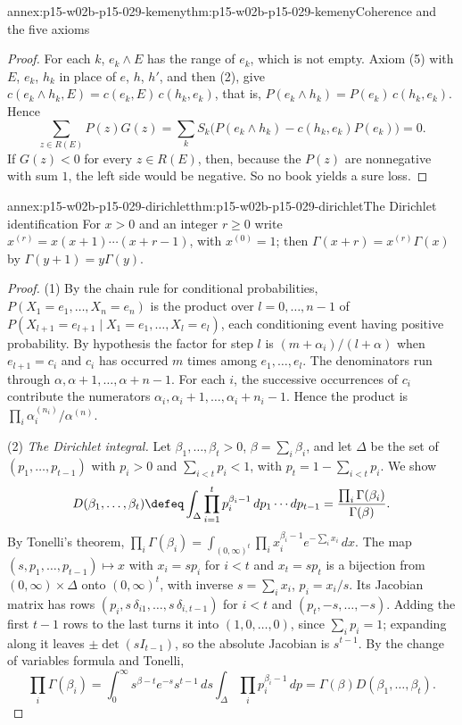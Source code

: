 \begin{annexitem}{annex:p15-w02b-p15-029-kemeny}{thm:p15-w02b-p15-029-kemeny}{Coherence and the five axioms}
\begin{proof}
For each \(k\), \(e_k\land E\) has the range of \(e_k\), which is not
empty. Axiom (5) with \(E\), \(e_k\), \(h_k\) in place of \(e\),
\(h\), \(h'\), and then (2), give
\(c(e_k\land h_k,E)=c(e_k,E)\,c(h_k,e_k)\), that is,
\(P(e_k\land h_k)=P(e_k)\,c(h_k,e_k)\). Hence
\[
 \sum_{z\in R(E)}P(z)G(z)=\sum_kS_k\bigl(P(e_k\land h_k)-c(h_k,e_k)P(e_k)\bigr)=0.
\]
If \(G(z)<0\) for every \(z\in R(E)\), then, because the \(P(z)\) are
nonnegative with sum \(1\), the left side would be negative. So no book
yields a sure loss.
\end{proof}
\end{annexitem}

\begin{annexitem}{annex:p15-w02b-p15-029-dirichlet}{thm:p15-w02b-p15-029-dirichlet}{The Dirichlet identification}
For \(x>0\) and an integer \(r\geq0\) write
\(x^{(r)}=x(x+1)\cdots(x+r-1)\), with \(x^{(0)}=1\); then
\(\Gamma(x+r)=x^{(r)}\Gamma(x)\) by \(\Gamma(y+1)=y\Gamma(y)\).
\begin{proof}
(1) By the chain rule for conditional probabilities,
\(P(X_1=e_1,\ldots,X_n=e_n)\) is the product over \(l=0,\ldots,n-1\)
of \(P(X_{l+1}=e_{l+1}\mid X_1=e_1,\ldots,X_l=e_l)\), each conditioning
event having positive probability. By hypothesis the factor for step
\(l\) is \((m+\alpha_i)/(l+\alpha)\) when \(e_{l+1}=c_i\) and \(c_i\)
has occurred \(m\) times among \(e_1,\ldots,e_l\). The denominators
run through \(\alpha,\alpha+1,\ldots,\alpha+n-1\). For each \(i\), the
successive occurrences of \(c_i\) contribute the numerators
\(\alpha_i,\alpha_i+1,\ldots,\alpha_i+n_i-1\). Hence the product is
\(\prod_i\alpha_i^{(n_i)}/\alpha^{(n)}\).

(2) \emph{The Dirichlet integral.} Let \(\beta_1,\ldots,\beta_t>0\),
\(\beta=\sum_i\beta_i\), and let \(\Delta\) be the set of
\((p_1,\ldots,p_{t-1})\) with \(p_i>0\) and \(\sum_{i<t}p_i<1\), with
\(p_t=1-\sum_{i<t}p_i\). We show
\[
 D(\beta_1,\ldots,\beta_t)\defeq\int_\Delta\prod_{i=1}^tp_i^{\beta_i-1}\,dp_1\cdots dp_{t-1}
 =\frac{\prod_i\Gamma(\beta_i)}{\Gamma(\beta)}.
\]
By Tonelli's theorem,
\(\prod_i\Gamma(\beta_i)=\int_{(0,\infty)^t}\prod_ix_i^{\beta_i-1}e^{-\sum_ix_i}\,dx\).
The map \((s,p_1,\ldots,p_{t-1})\mapsto x\) with \(x_i=sp_i\) for
\(i<t\) and \(x_t=sp_t\) is a bijection from \((0,\infty)\times\Delta\)
onto \((0,\infty)^t\), with inverse \(s=\sum_ix_i\), \(p_i=x_i/s\). Its
Jacobian matrix has rows \((p_i,s\,\delta_{i1},\ldots,s\,\delta_{i,t-1})\)
for \(i<t\) and \((p_t,-s,\ldots,-s)\). Adding the first \(t-1\) rows to
the last turns it into \((1,0,\ldots,0)\), since \(\sum_ip_i=1\);
expanding along it leaves \(\pm\det(sI_{t-1})\), so the absolute
Jacobian is \(s^{t-1}\). By the change of variables formula and Tonelli,
\[
 \prod_i\Gamma(\beta_i)=\int_0^\infty s^{\beta-t}e^{-s}s^{t-1}\,ds\int_\Delta\prod_ip_i^{\beta_i-1}\,dp
 =\Gamma(\beta)D(\beta_1,\ldots,\beta_t).
\]


\end{proof}
\end{annexitem}
